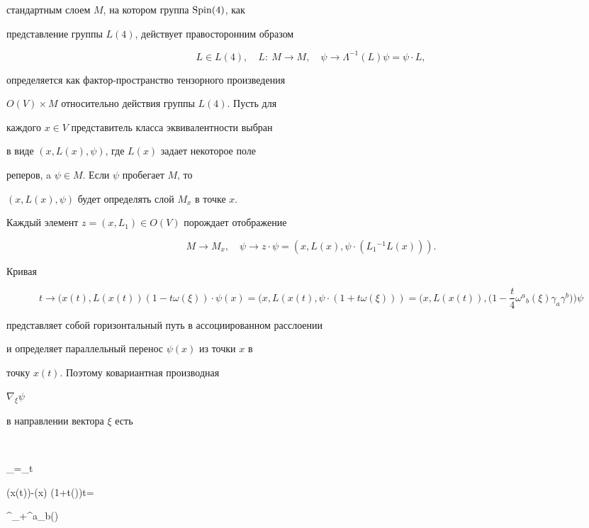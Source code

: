 стандартным слоем $M$, на котором группа $\operatorname{Spin}(4)$, как


представление группы $L(4)$, действует правосторонним образом


$$


L\in L(4),\quad L:\ M\rightarrow M,\quad \psi\rightarrow \Lambda


^{-1}(L)\psi=\psi\cdot L,


$$


определяется как фактор-пространство тензорного произведения


$O(V)\times M$ относительно действия группы $L(4)$. Пусть для


каждого $x\in V$ представитель класса эквивалентности выбран


в виде $(x,L(x),\psi)$, где $L(x)$ задает некоторое поле


реперов, a $\psi\in M$. Если $\psi$ пробегает $M$, то


${(x,L(x),\psi)}$ будет определять слой $M_x$ в точке $x$.


Каждый элемент $z=(x,L_1)\in O(V)$ порождает отображение


$$


M\rightarrow M_x,\quad \psi\rightarrow z\cdot \psi=


(x,L(x),\psi\cdot (L_1{}^{-1}L(x))).


$$


Кривая


$$


t \rightarrow (x(t),L(x(t))(1-t\omega (\xi)) \cdot \psi(x)=


(x,L(x(t),\psi\cdot(1+t\omega(\xi)))=


\biggl(x,L(x(t)),\biggl(1-\frac{t}{4}\omega^a{}_b(\xi)\gamma_a\gamma^b


\biggr)\biggr)\psi


$$


представляет собой горизонтальный путь в ассоциированном расслоении


и определяет параллельный перенос $\psi(x)$ из точки $x$ в


точку $x(t)$. Поэтому ковариантная производная


$\nabla_\xi\psi$


в направлении вектора $\xi$ есть


$$


\nabla_\xi\psi=\lim_{t }\frac


{\psi(x(t))-\psi(x) \cdot (1+t\omega(\xi))}{t}=


\xi^\alpha\partial_\alpha\psi+\omega^a{}_b(\xi)


